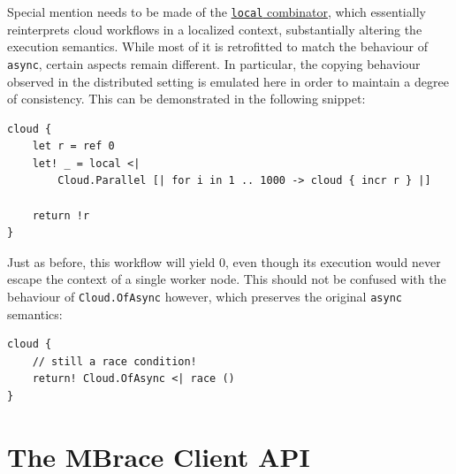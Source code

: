 \documentclass[9pt,a4paper]{article}
\newcommand{\TitularMbrace}{MBrace}
\begin{document}
\label{localSemantics}
Special mention needs to be made of the \hyperref[localCombinator]{\texttt{local} combinator},
which essentially reinterprets cloud workflows in a localized context,
substantially altering the execution semantics. While most of it is retrofitted
to match the behaviour of \texttt{async}, certain aspects remain different.
In particular, the copying behaviour observed in the distributed setting is emulated here
in order to maintain a degree of consistency. This can be demonstrated in the following
snippet:
\begin{lstlisting}
cloud {
    let r = ref 0
    let! _ = local <| 
        Cloud.Parallel [| for i in 1 .. 1000 -> cloud { incr r } |]

    return !r
}
\end{lstlisting}
Just as before, this workflow will yield 0, even though its execution would never
escape the context of a single worker node. This should not be confused with the
behaviour of \texttt{Cloud.OfAsync} however, which preserves the original \texttt{async}
semantics:
\begin{lstlisting}
cloud {
    // still a race condition!
    return! Cloud.OfAsync <| race ()
}
\end{lstlisting}


%
%
%

\section{The \TitularMbrace{} Client API}
\label{sec:client}
\end{document}
